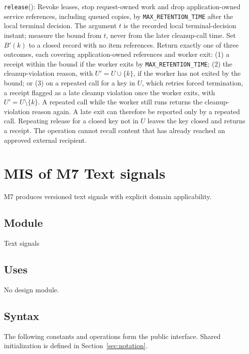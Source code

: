\documentclass[12pt, titlepage]{article}
\newcommand{\Const}[1]{\texttt{#1}}
\begin{document}
\medskip\noindent \texttt{release}():
Revoke leases, stop request-owned work and drop application-owned service references, including queued copies, by \Const{MAX\_\allowbreak{}RETENTION\_\allowbreak{}TIME} after the local terminal decision. The argument $t$ is the recorded local terminal-decision instant; measure the bound from $t$, never from the later cleanup-call time. Set $B'(k)$ to a closed record with no item references. Return exactly one of three outcomes, each covering application-owned references and worker exit: (1) a receipt within the bound if the worker exits by \Const{MAX\_\allowbreak{}RETENTION\_\allowbreak{}TIME}; (2) the cleanup-violation reason, with $U'=U\cup\{k\}$, if the worker has not exited by the bound; or (3) on a repeated call for a key in $U$, which retries forced termination, a receipt flagged as a late cleanup violation once the worker exits, with $U'=U\setminus\{k\}$. A repeated call while the worker still runs returns the cleanup-violation reason again. A late exit can therefore be reported only by a repeated call. Repeating release for a closed key not in $U$ leaves the key closed and returns a receipt. The operation cannot recall content that has already reached an approved external recipient.

\clearpage
\section{MIS of M7 Text signals} \label{sec:m7}

M7 produces versioned text signals with explicit domain applicability.

\subsection{Module}

Text signals

\subsection{Uses}

No design module.

\subsection{Syntax}

The following constants and operations form the public interface. Shared initialization is defined in Section~\ref{sec:notation}.
\end{document}
